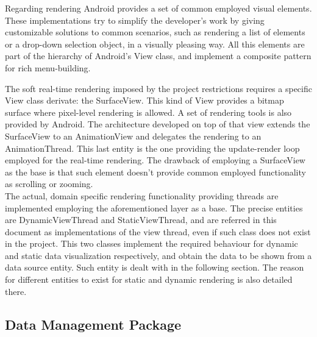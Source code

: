 		Regarding rendering Android provides a set of common employed visual elements. These implementations try to simplify the developer's work by giving customizable solutions to common scenarios, such as rendering a list of elements or a drop-down selection object, in a visually pleasing way. All this elements are part of the hierarchy of Android's View class, and implement a composite pattern for rich menu-building.

		The soft real-time rendering imposed by the project restrictions requires a specific View \cite{andev-view} class derivate: the SurfaceView. This kind of View provides a bitmap surface where pixel-level rendering is allowed. A set of rendering tools is also provided by Android. The architecture developed on top of that view extends the SurfaceView to an AnimationView and delegates the rendering to an AnimationThread. This last entity is the one providing the update-render loop employed for the real-time rendering. The drawback of employing a SurfaceView as the base is that such element doesn't provide common employed functionality as scrolling or zooming.\\

		The actual, domain specific rendering functionality providing threads are implemented employing the aforementioned layer as a base. The precise entities are DynamicViewThread and StaticViewThread, and are referred in this document as implementations of the view thread, even if such class does not exist in the project. This two classes implement the required behaviour for dynamic and static data visualization respectively, and obtain the data to be shown from a data source entity. Such entity is dealt with in the following section. The reason for different entities to exist for static and dynamic rendering is also detailed there.\\

		\subsection{Data Management Package}

		
